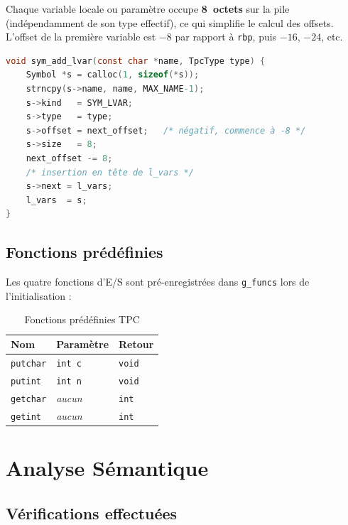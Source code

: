 \documentclass[12pt,a4paper]{article}
\begin{document}
Chaque variable locale ou paramètre occupe \textbf{8~octets} sur la pile
(indépendamment de son type effectif), ce qui simplifie le calcul des offsets.
L'offset de la première variable est $-8$ par rapport à \texttt{rbp}, puis
$-16$, $-24$, etc.

\begin{lstlisting}[language=C, caption={Allocation d'une variable locale}]
void sym_add_lvar(const char *name, TpcType type) {
    Symbol *s = calloc(1, sizeof(*s));
    strncpy(s->name, name, MAX_NAME-1);
    s->kind   = SYM_LVAR;
    s->type   = type;
    s->offset = next_offset;   /* négatif, commence à -8 */
    s->size   = 8;
    next_offset -= 8;
    /* insertion en tête de l_vars */
    s->next = l_vars;
    l_vars  = s;
}
\end{lstlisting}

\subsection{Fonctions prédéfinies}

Les quatre fonctions d'E/S sont pré-enregistrées dans \texttt{g\_funcs}
lors de l'initialisation :

\begin{table}[H]
\centering
\begin{tabular}{lll}
\toprule
\textbf{Nom} & \textbf{Paramètre} & \textbf{Retour} \\
\midrule
\texttt{putchar} & \texttt{int c}  & \texttt{void} \\
\texttt{putint}  & \texttt{int n}  & \texttt{void} \\
\texttt{getchar} & \textit{aucun}  & \texttt{int} \\
\texttt{getint}  & \textit{aucun}  & \texttt{int} \\
\bottomrule
\end{tabular}
\caption{Fonctions prédéfinies TPC}
\end{table}

\section{Analyse Sémantique}

\subsection{Vérifications effectuées}
\end{document}
